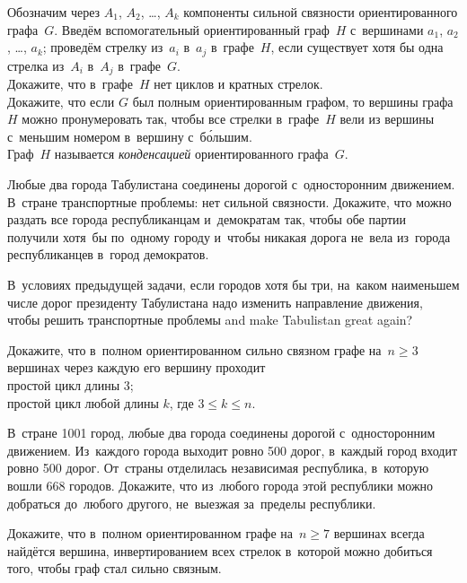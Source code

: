 \begin{problems}

\item
Обозначим через $A_{1}$, $A_{2}$, \ldots, $A_{k}$ компоненты сильной связности
ориентированного графа~$G$.
Введём вспомогательный ориентированный граф~$H$ с~вершинами
$a_{1}$, $a_{2}$, \ldots, $a_{k}$;
проведём стрелку из~$a_{i}$ в~$a_{j}$ в~графе~$H$, если существует хотя бы одна
стрелка из~$A_{i}$ в~$A_{j}$ в~графе~$G$.
\\
\subproblem
Докажите, что в~графе~$H$ нет циклов и кратных стрелок.
\\
\subproblem
Докажите, что если $G$ был полным ориентированным графом, то вершины графа~$H$
можно пронумеровать так, чтобы все стрелки в~графе~$H$ вели из вершины
с~меньшим номером в~вершину с~б\'{о}льшим.
\\
Граф~$H$ называется \emph{конденсацией} ориентированного графа~$G$.

\item
Любые два города Табулистана соединены дорогой с~односторонним движением.
В~стране транспортные проблемы: нет сильной связности.
Докажите, что можно раздать все города республиканцам и~демократам так, чтобы
обе партии получили хотя~бы по~одному городу и~чтобы никакая дорога не~вела
из~города республиканцев в~город демократов.

\item
В~условиях предыдущей задачи, если городов хотя бы три, на~каком наименьшем
числе дорог президенту Табулистана надо изменить направление движения, чтобы
решить транспортные проблемы and make Tabulistan great again?

\item
Докажите, что в~полном ориентированном сильно связном графе на~$n \geq 3$
вершинах через каждую его вершину проходит
\\
\subproblem простой цикл длины $3$;
\\
\subproblem простой цикл любой длины $k$, где $3 \leq k \leq n$.

\item
В~стране 1001 город, любые два города соединены дорогой с~односторонним
движением.
Из~каждого города выходит ровно 500 дорог, в~каждый город входит ровно 500
дорог.
От~страны отделилась независимая республика, в~которую вошли 668 городов.
Докажите, что из~любого города этой республики можно добраться до~любого
другого, не~выезжая за~пределы республики.

\item
Докажите, что в~полном ориентированном графе на~$n \geq 7$ вершинах всегда
найдётся вершина, инвертированием всех стрелок в~которой можно добиться того,
чтобы граф стал сильно связным.


\end{problems}
